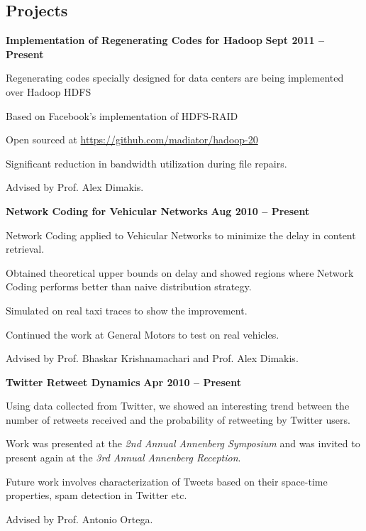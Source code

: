 \documentclass[margin,line]{resume}
\begin{document}
\begin{resume}
\section{\mysidestyle Projects}
  \textbf{Implementation of Regenerating Codes for Hadoop} \hfill \textbf{Sept 2011 -- Present}
  \begin{list2}
   \item Regenerating codes specially designed for data centers are being implemented over Hadoop HDFS
   \item Based on Facebook's implementation of HDFS-RAID
   \item Open sourced at \href{https://github.com/madiator/hadoop-20}{https://github.com/madiator/hadoop-20}
   \item Significant reduction in bandwidth utilization during file repairs.
   \item Advised by Prof. Alex Dimakis. 
  \end{list2}
  
  \textbf{Network Coding for Vehicular Networks} \hfill \textbf{Aug 2010 -- Present}
  \begin{list2}
   \item Network Coding applied to Vehicular Networks to minimize the delay in content retrieval. 
   \item Obtained theoretical upper bounds on delay and showed regions where Network Coding performs better than naive distribution strategy.
   \item Simulated on real taxi traces to show the improvement.
   \item Continued the work at General Motors to test on real vehicles. 
   \item Advised by Prof. Bhaskar Krishnamachari and Prof. Alex Dimakis. 
  \end{list2}
  
  \textbf{Twitter Retweet Dynamics} \hfill \textbf{Apr 2010 -- Present}
  \begin{list2}
   \item Using data collected from Twitter, we showed an interesting trend between the number of retweets received and the probability of retweeting by Twitter users. 
   \item Work was presented at the \textsl{2nd Annual Annenberg Symposium} and was invited to present again at the \textsl{3rd Annual Annenberg Reception}.
   \item Future work involves characterization of Tweets based on their space-time properties, spam detection in Twitter etc. 
   \item Advised by Prof. Antonio Ortega.
  \end{list2}


\end{resume}
\end{document}
